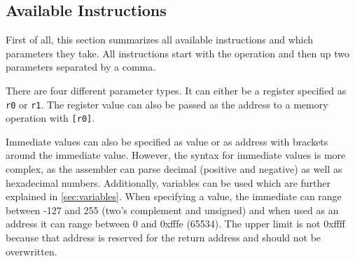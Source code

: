 \subsection{Available Instructions}
First of all, this section summarizes all available instructions and which parameters they take.
All instructions start with the operation and then up two parameters separated by a comma.

There are four different parameter types.
It can either be a register specified as \texttt{r0} or \texttt{r1}.
The register value can also be passed as the address to a memory operation with \texttt{[r0]}.

Immediate values can also be specified as value or as address with brackets around the immediate value.
However, the syntax for immediate values is more complex, as the assembler can parse decimal (positive and negative) as well as hexadecimal numbers.
Additionally, variables can be used which are further explained in \cref{sec:variables}.
When specifying a value, the immediate can range between -127 and 255 (two's complement and unsigned) and when used as an address it can range between 0 and 0xfffe (65534). The upper limit is not 0xffff because that address is reserved for the return address and should not be overwritten.
